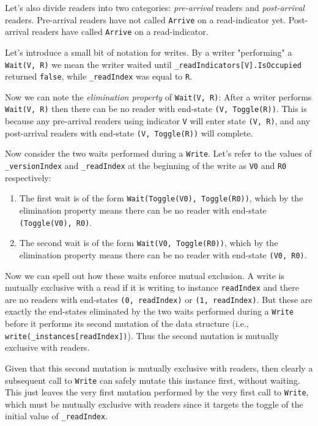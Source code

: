 \documentclass[11pt]{article}
\begin{document}
Let's also divide readers into two categories: \emph{pre-arrival} readers and \emph{post-arrival} readers. Pre-arrival readers have not called \texttt{Arrive} on a read-indicator yet. Post-arrival readers have called \texttt{Arrive} on a read-indicator.

Let's introduce a small bit of notation for writes. By a writer "performing" a \texttt{Wait(V, R)} we mean the writer waited until \texttt{\_readIndicators[V].IsOccupied} returned \texttt{false}, while \texttt{\_readIndex} was equal to \texttt{R}.

Now we can note the \emph{elimination property} of \texttt{Wait(V, R)}: After a writer performs \texttt{Wait(V, R)} then there can be no reader with end-state \texttt{(V, Toggle(R))}. This is because any pre-arrival readers using indicator \texttt{V} will enter state \texttt{(V, R)}, and any post-arrival readers with end-state \texttt{(V, Toggle(R))} will complete.

Now consider the two waits performed during a \texttt{Write}. Let's refer to the values of \texttt{\_versionIndex} and \texttt{\_readIndex} at the beginning of the write as \texttt{V0} and \texttt{R0} respectively:

\begin{enumerate}
\item The first wait is of the form \texttt{Wait(Toggle(V0), Toggle(R0))}, which by the elimination property means there can be no reader with end-state \texttt{(Toggle(V0), R0)}.

\item The second wait is of the form \texttt{Wait(V0, Toggle(R0))}, which by the elimination property means there can be no reader with end-state \texttt{(V0, R0)}.
\end{enumerate}

Now we can spell out how these waits enforce mutual exclusion. A write is mutually exclusive with a read if it is writing to instance \texttt{readIndex} and there are no readers with end-states \texttt{(0, readIndex)} or \texttt{(1, readIndex)}. But these are exactly the end-states eliminated by the two waits performed during a \texttt{Write} before it performs its second mutation of the data structure (i.e., \texttt{write(\_instances[readIndex])}). Thus the second mutation is mutually exclusive with readers.

Given that this second mutation is mutually exclusive with readers, then clearly a subsequent call to \texttt{Write} can safely mutate this instance first, without waiting. This just leaves the very first mutation performed by the very first call to \texttt{Write}, which must be mutually exclusive with readers since it targets the toggle of the initial value of \texttt{\_readIndex}.
\end{document}

